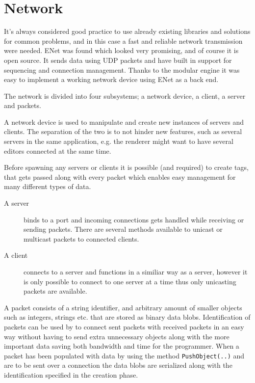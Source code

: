 \section{Network}
It's always considered good practice to use already existing libraries and solutions for common problems, and in this case a fast and reliable network transmission were needed.
ENet was found which looked very promising, and of course it is open source. It sends data using UDP packets and have built in support for sequencing and connection management. 
Thanks to the modular engine it was easy to implement a working network device using ENet as a back end.

The network is divided into four subsystems; a network device, a client, a server and packets.

A network device is used to manipulate and create new instances of servers and clients. The separation of the two is to not hinder new features, such as several servers in the same application, e.g. the renderer might want to have several editors connected at the same time.

Before spawning any servers or clients it is possible (and required) to create tags, that gets passed along with every packet which enables easy management for many different types of data.

\begin{description}
	\item[A server] binds to a port and incoming connections gets handled while receiving or sending packets. There are several methods available to unicast or multicast packets to connected clients.
	\item[A client] connects to a server and functions in a similiar way as a server, however it is only possible to connect to one server at a time thus only unicasting packets are available.
\end{description}

A packet consists of a string identifier, and arbitrary amount of smaller objects such as integers, strings etc. that are stored as binary data blobs.
Identification of packets can be used by to connect sent packets with received packets in an easy way without having to send extra unnecessary objects along with the more important data saving both bandwidth and time for the programmer.
When a packet has been populated with data by using the method \texttt{PushObject(..)} and are to be sent over a connection the data blobs are serialized along with the identification specified in the creation phase.


